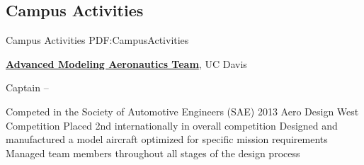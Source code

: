 \documentclass[letterpaper,MMMyyyy,nonstop]{simpleresumecv}
\begin{document}
\begin{body}






\section
{Campus Activities}
{Campus Activities}
{PDF:CampusActivities}

\href{http://www.example.com/my-club}
{\textbf{Advanced Modeling Aeronautics Team}},
UC Davis

\GapNoBreak
\BulletItem
Captain
\hfill
{} --
\begin{detail}
\SubBulletItem
Competed in the Society of Automotive Engineers (SAE) 2013 Aero Design West Competition
\SubBulletItem
Placed 2nd internationally in overall competition
\SubBulletItem
Designed and manufactured a model aircraft optimized for specific mission requirements
\SubBulletItem
Managed team members throughout all stages of the design process
\end{detail}


\end{body}
\end{document}
